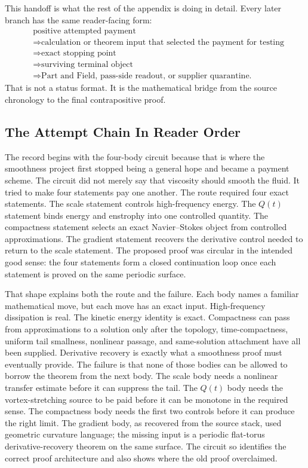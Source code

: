 This handoff is what the rest of the appendix is doing in detail.
Every later branch has the same reader-facing form:
\[
  \begin{aligned}
  &\text{positive attempted payment}\\
  &\Longrightarrow
  \text{calculation or theorem input that selected the payment for testing}\\
  &\Longrightarrow
  \text{exact stopping point}\\
  &\Longrightarrow
  \text{surviving terminal object}\\
  &\Longrightarrow
  \text{Part and Field, pass-side readout, or supplier quarantine.}
  \end{aligned}
\]
That is not a status format.
It is the mathematical bridge from the source chronology to the final
contrapositive proof.

\subsection{The Attempt Chain In Reader Order}

The record begins with the four-body circuit because that is where the
smoothness project first stopped being a general hope and became a payment
scheme.
The circuit did not merely say that viscosity should smooth the fluid.
It tried to make four statements pay one another.
The route required four exact statements.
The scale statement controls high-frequency energy.
The \(Q(t)\) statement binds energy and enstrophy into one controlled quantity.
The compactness statement selects an exact Navier--Stokes object from controlled
approximations.
The gradient statement recovers the derivative control needed to return to the
scale statement.
The proposed proof was circular in the intended good sense: the four statements
form a closed continuation loop once each statement is proved on the same
periodic surface.

That shape explains both the route and the failure.
Each body names a familiar mathematical move, but each move has an exact input.
High-frequency dissipation is real.
The kinetic energy identity is exact.
Compactness can pass from approximations to a solution only after the topology,
time-compactness, uniform tail smallness, nonlinear passage, and same-solution
attachment have all been supplied.
Derivative recovery is exactly what a smoothness proof must eventually provide.
The failure is that none of those bodies can be allowed to borrow the theorem
from the next body.
The scale body needs a nonlinear transfer estimate before it can suppress the
tail.
The \(Q(t)\) body needs the vortex-stretching source to be paid before it can be
monotone in the required sense.
The compactness body needs the first two controls before it can produce the
right limit.
The gradient body, as recovered from the source stack, used geometric curvature
language; the missing input is a periodic flat-torus derivative-recovery theorem
on the same surface.
The circuit so identifies the correct proof architecture and also shows
where the old proof overclaimed.

